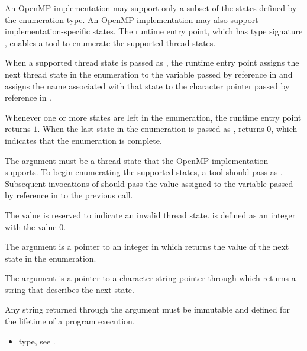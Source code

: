 \descr
An OpenMP implementation may support only a subset of the states defined by
the  enumeration type. An OpenMP implementation may also
support implementation-specific states. The 
runtime entry point, which has type signature , 
 enables a tool to enumerate the supported thread states.

When a supported thread state is passed as , the runtime 
entry point assigns the next thread state in the enumeration to the variable 
passed by reference in  and assigns the name associated with 
that state to the character pointer passed by reference in .

Whenever one or more states are left in the enumeration, the 
 runtime entry point returns $1$. When 
the last state in the enumeration is passed as , 
 returns $0$, which indicates that the 
enumeration is complete.

\argdesc
The  argument must be a thread state that the OpenMP 
implementation supports. To begin enumerating the supported states, a tool 
should pass  as . Subsequent
invocations of  should pass the value assigned 
to the variable passed by reference in  to the previous call.

The value  is reserved to indicate an invalid thread 
state.  is defined as an integer with the value 0.

The  argument is a pointer to an integer in which 
 returns the value of the next state in the enumeration.

The  argument is a pointer to a character string 
pointer through which  returns a string 
that describes the next state.

\constraints
Any string returned through the  argument must be 
immutable and defined for the lifetime of a program execution.

\crossreferences
\begin{itemize}
\item {} type, see .
\end{itemize}



